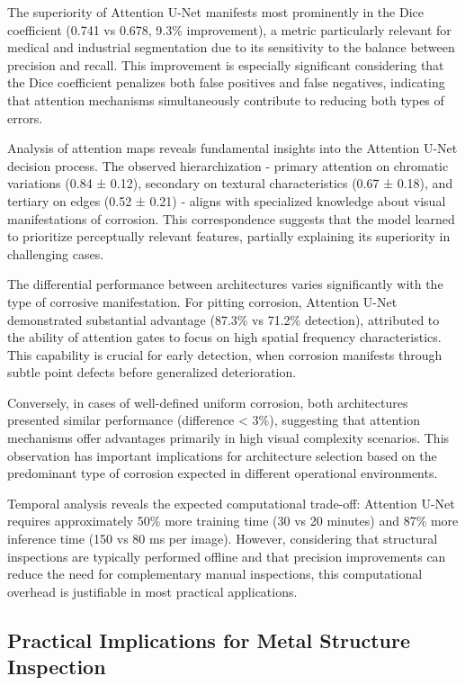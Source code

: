 \documentclass[12pt,a4paper,twoside]{article}
\begin{document}
The superiority of Attention U-Net manifests most prominently in the Dice coefficient (0.741 vs 0.678, 9.3\% improvement), a metric particularly relevant for medical and industrial segmentation due to its sensitivity to the balance between precision and recall. This improvement is especially significant considering that the Dice coefficient penalizes both false positives and false negatives, indicating that attention mechanisms simultaneously contribute to reducing both types of errors.

Analysis of attention maps reveals fundamental insights into the Attention U-Net decision process. The observed hierarchization - primary attention on chromatic variations (0.84 ± 0.12), secondary on textural characteristics (0.67 ± 0.18), and tertiary on edges (0.52 ± 0.21) - aligns with specialized knowledge about visual manifestations of corrosion. This correspondence suggests that the model learned to prioritize perceptually relevant features, partially explaining its superiority in challenging cases.

The differential performance between architectures varies significantly with the type of corrosive manifestation. For pitting corrosion, Attention U-Net demonstrated substantial advantage (87.3\% vs 71.2\% detection), attributed to the ability of attention gates to focus on high spatial frequency characteristics. This capability is crucial for early detection, when corrosion manifests through subtle point defects before generalized deterioration.

Conversely, in cases of well-defined uniform corrosion, both architectures presented similar performance (difference < 3\%), suggesting that attention mechanisms offer advantages primarily in high visual complexity scenarios. This observation has important implications for architecture selection based on the predominant type of corrosion expected in different operational environments.

Temporal analysis reveals the expected computational trade-off: Attention U-Net requires approximately 50\% more training time (30 vs 20 minutes) and 87\% more inference time (150 vs 80 ms per image). However, considering that structural inspections are typically performed offline and that precision improvements can reduce the need for complementary manual inspections, this computational overhead is justifiable in most practical applications.

\subsection{Practical Implications for Metal Structure Inspection}
\label{subsec:practical_implications}
\end{document}

